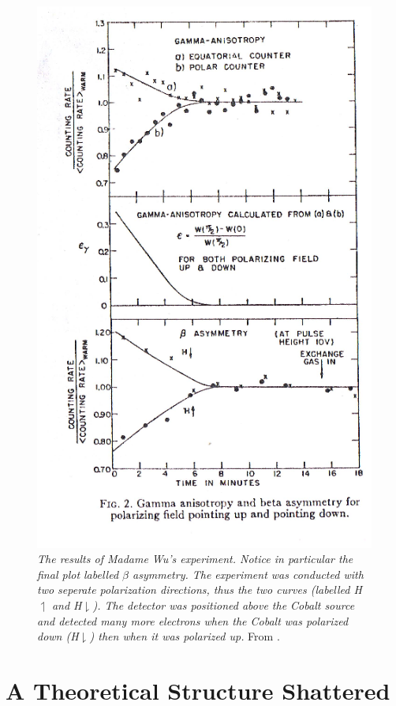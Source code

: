 \documentclass[a4paper,12pt]{book}
\begin{document}
\begin{figure}
\center
\includegraphics{figures/wu.eps}
\caption{\textit{The results of Madame Wu's experiment. Notice in particular the final plot labelled $\beta$ asymmetry. The experiment was conducted with two seperate polarization directions, thus the two curves (labelled H$\upharpoonleft$ and H$\downharpoonright$). The detector was positioned above the Cobalt source and detected many more electrons when the Cobalt was polarized down (H$\downharpoonright$) then when it was polarized up.} From \cite{wu}.}
\end{figure}

\section{A Theoretical Structure Shattered}
\end{document}
